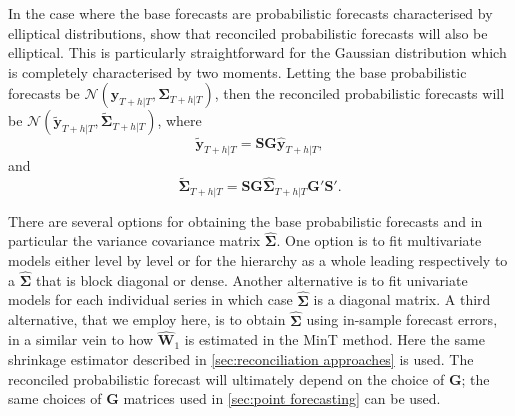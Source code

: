 \documentclass[graybox]{svmult}
\begin{document}

In the case where the base forecasts are probabilistic forecasts characterised by elliptical distributions, \citet{GamEtAl2018} show that reconciled probabilistic forecasts will also be elliptical. This is particularly straightforward for the Gaussian distribution which is completely characterised by two moments. Letting the base probabilistic forecasts be $\mathscr{N}(\bm{\hat{y}}_{T+h|T}, \hat{\bm{\Sigma}}_{T+h|T})$, then the reconciled probabilistic forecasts will be $\mathscr{N}(\bm{\tilde{y}}_{T+h|T}, \tilde{\bm{\Sigma}}_{T+h|T})$, where
\begin{equation}\label{eq:rec mean}
	\bm{\tilde{y}}_{T+h|T} = \bm{SG}\bm{\hat{y}}_{T+h|T},
\end{equation}
and
\begin{equation}\label{eq:rec var}
	\tilde{\bm{\Sigma}}_{T+h|T} = \bm{SG}\hat{\bm{\Sigma}}_{T+h|T}\bm{G'S'}.
\end{equation}

There are several options for obtaining the base probabilistic forecasts and in particular the variance covariance matrix $\hat{\bm{\Sigma}}$. One option is to fit multivariate models either level by level or for the hierarchy as a whole leading respectively to a $\hat{\bm \Sigma}$ that is block diagonal or dense. Another alternative is to fit univariate models for each individual series in which case $\hat{\bm{\Sigma}}$ is a diagonal matrix. A third alternative, that we employ here, is to obtain $\hat{\bm{\Sigma}}$ using in-sample forecast errors, in a similar vein to how $\hat{\bm{W}}_{1}$ is estimated in the MinT method. Here the same shrinkage estimator described in \autoref{sec:reconciliation approaches} is used. The reconciled probabilistic forecast will ultimately depend on the choice of $\bm{G}$; the same choices of $\bm{G}$ matrices used in \autoref{sec:point forecasting} can be used.
\end{document}
